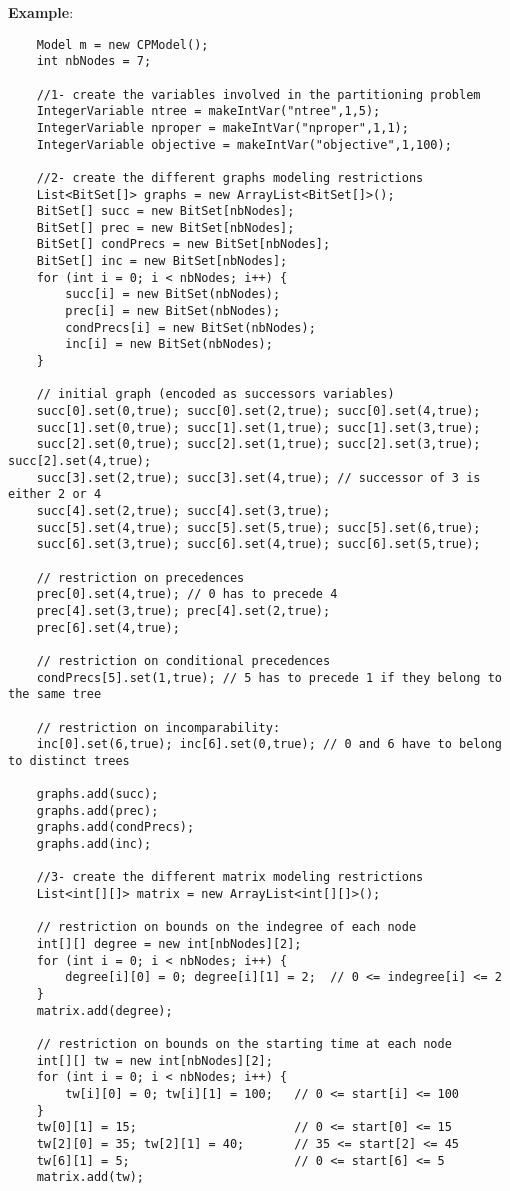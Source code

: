 \textbf{Example}:
\begin{lstlisting}
	Model m = new CPModel();
	int nbNodes = 7;

	//1- create the variables involved in the partitioning problem
	IntegerVariable ntree = makeIntVar("ntree",1,5);
	IntegerVariable nproper = makeIntVar("nproper",1,1);
	IntegerVariable objective = makeIntVar("objective",1,100);

	//2- create the different graphs modeling restrictions
	List<BitSet[]> graphs = new ArrayList<BitSet[]>();
	BitSet[] succ = new BitSet[nbNodes];
	BitSet[] prec = new BitSet[nbNodes];
	BitSet[] condPrecs = new BitSet[nbNodes];
	BitSet[] inc = new BitSet[nbNodes];
	for (int i = 0; i < nbNodes; i++) {
	    succ[i] = new BitSet(nbNodes);
	    prec[i] = new BitSet(nbNodes);
	    condPrecs[i] = new BitSet(nbNodes);
	    inc[i] = new BitSet(nbNodes);
	}

    // initial graph (encoded as successors variables)
	succ[0].set(0,true); succ[0].set(2,true); succ[0].set(4,true);
	succ[1].set(0,true); succ[1].set(1,true); succ[1].set(3,true);
	succ[2].set(0,true); succ[2].set(1,true); succ[2].set(3,true); succ[2].set(4,true);
	succ[3].set(2,true); succ[3].set(4,true); // successor of 3 is either 2 or 4
	succ[4].set(2,true); succ[4].set(3,true);
	succ[5].set(4,true); succ[5].set(5,true); succ[5].set(6,true);
	succ[6].set(3,true); succ[6].set(4,true); succ[6].set(5,true);

    // restriction on precedences
	prec[0].set(4,true); // 0 has to precede 4 
	prec[4].set(3,true); prec[4].set(2,true);
	prec[6].set(4,true);

    // restriction on conditional precedences
	condPrecs[5].set(1,true); // 5 has to precede 1 if they belong to the same tree 

    // restriction on incomparability:
	inc[0].set(6,true);	inc[6].set(0,true); // 0 and 6 have to belong to distinct trees

	graphs.add(succ);
	graphs.add(prec);
	graphs.add(condPrecs);
	graphs.add(inc);

	//3- create the different matrix modeling restrictions
	List<int[][]> matrix = new ArrayList<int[][]>();

    // restriction on bounds on the indegree of each node 
	int[][] degree = new int[nbNodes][2];
	for (int i = 0; i < nbNodes; i++) {
	    degree[i][0] = 0; degree[i][1] = 2;  // 0 <= indegree[i] <= 2
	}
	matrix.add(degree);

    // restriction on bounds on the starting time at each node 
	int[][] tw = new int[nbNodes][2];
	for (int i = 0; i < nbNodes; i++) {
	    tw[i][0] = 0; tw[i][1] = 100;   // 0 <= start[i] <= 100
	}
	tw[0][1] = 15;        				// 0 <= start[0] <= 15
	tw[2][0] = 35; tw[2][1] = 40;		// 35 <= start[2] <= 45
	tw[6][1] = 5;        				// 0 <= start[6] <= 5
	matrix.add(tw);


\end{lstlisting}
